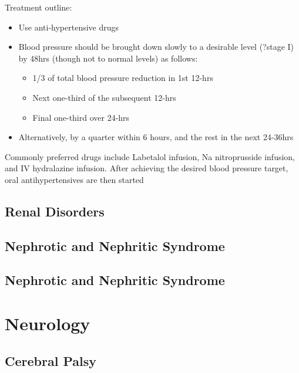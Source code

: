 \documentclass[
  letterpaper,
  DIV=11,
  numbers=noendperiod]{scrreprt}
\providecommand{\tightlist}{%
  \setlength{\itemsep}{0pt}\setlength{\parskip}{0pt}}\usepackage{longtable,booktabs,array}
\begin{document}
Treatment outline:

\begin{itemize}
\tightlist
\item
  Use anti-hypertensive drugs
\item
  Blood pressure should be brought down slowly to a desirable level
  (?stage I) by 48hrs (though not to normal levels) as follows:

  \begin{itemize}
  \tightlist
  \item
    1/3 of total blood pressure reduction in 1st 12-hrs
  \item
    Next one-third of the subsequent 12-hrs
  \item
    Final one-third over 24-hrs
  \end{itemize}
\item
  Alternatively, by a quarter within 6 hours, and the rest in the next
  24-36hrs
\end{itemize}

Commonly preferred drugs include Labetalol infusion, Na nitroprusside
infusion, and IV hydralazine infusion. After achieving the desired blood
pressure target, oral antihypertensives are then started

\hypertarget{renal-disorders}{%
\chapter{Renal Disorders}\label{renal-disorders}}

\hypertarget{nephrotic-and-nephritic-syndrome}{%
\chapter{Nephrotic and Nephritic
Syndrome}\label{nephrotic-and-nephritic-syndrome}}

\hypertarget{nephrotic-and-nephritic-syndrome-1}{%
\chapter{Nephrotic and Nephritic
Syndrome}\label{nephrotic-and-nephritic-syndrome-1}}

\part{{Neurology}}

\hypertarget{cerebral-palsy}{%
\chapter{Cerebral Palsy}\label{cerebral-palsy}}
\end{document}
